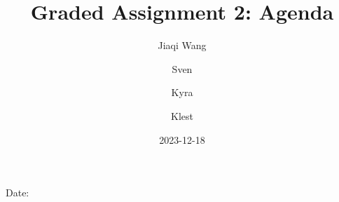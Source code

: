 \documentclass{article}
\title{Graded Assignment 2: Agenda}
\author{
    Jiaqi Wang \and
    Sven \and
    Kyra \and
    Klest
}
\begin{document}
\maketitle

Date: \date{2023-12-18}
\end{document}
